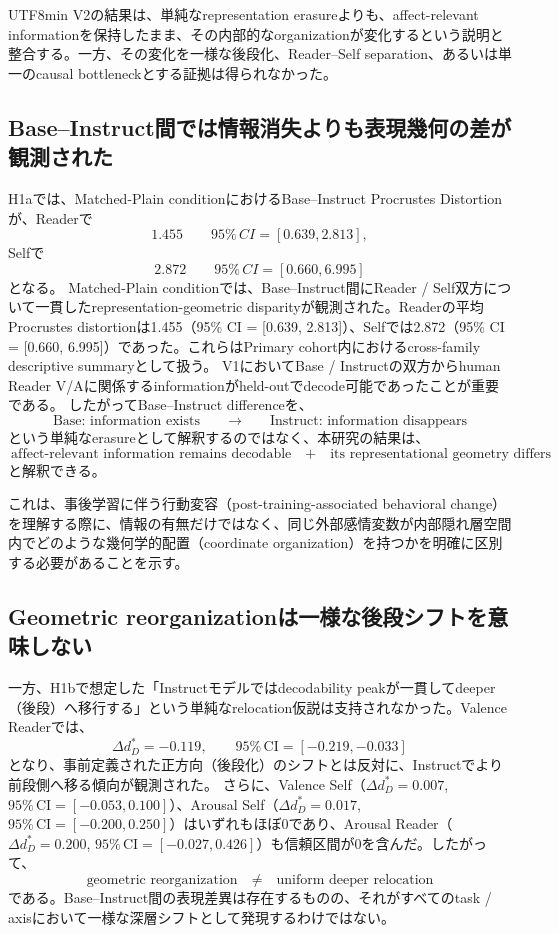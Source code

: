 \documentclass{article} %
\begin{document}
\begin{CJK*}{UTF8}{min}
V2の結果は、単純なrepresentation erasureよりも、affect-relevant informationを保持したまま、その内部的なorganizationが変化するという説明と整合する。一方、その変化を一様な後段化、Reader--Self separation、あるいは単一のcausal bottleneckとする証拠は得られなかった。


\subsection{Base--Instruct間では情報消失よりも表現幾何の差が観測された}

H1aでは、Matched-Plain conditionにおけるBase--Instruct Procrustes Distortionが、Readerで
\[
1.455
\qquad
95\%\,CI=[0.639,2.813],
\]
Selfで
\[
2.872
\qquad
95\%\,CI=[0.660,6.995]
\]
となる。
Matched-Plain conditionでは、Base--Instruct間にReader / Self双方について一貫したrepresentation-geometric disparityが観測された。Readerの平均Procrustes distortionは1.455（95\% CI = [0.639, 2.813]）、Selfでは2.872（95\% CI = [0.660, 6.995]）であった。これらはPrimary cohort内におけるcross-family descriptive summaryとして扱う。
V1においてBase / Instructの双方からhuman Reader V/Aに関係するinformationがheld-outでdecode可能であったことが重要である。
したがってBase--Instruct differenceを、
\[
\text{Base: information exists}
\qquad
\rightarrow
\qquad
\text{Instruct: information disappears}
\]
という単純なerasureとして解釈するのではなく、本研究の結果は、
\[
\text{affect-relevant information remains decodable}
\quad+\quad
\text{its representational geometry differs}
\]
と解釈できる。

これは、事後学習に伴う行動変容（post-training-associated behavioral change）を理解する際に、情報の有無だけではなく、同じ外部感情変数が内部隠れ層空間内でどのような幾何学的配置（coordinate organization）を持つかを明確に区別する必要があることを示す。


\subsection{Geometric reorganizationは一様な後段シフトを意味しない}

一方、H1bで想定した「Instructモデルではdecodability peakが一貫してdeeper（後段）へ移行する」という単純なrelocation仮説は支持されなかった。Valence Readerでは、
\[
\Delta d_D^* = -0.119, \qquad 95\%\,\text{CI} = [-0.219, -0.033]
\]
となり、事前定義された正方向（後段化）のシフトとは反対に、Instructでより前段側へ移る傾向が観測された。
さらに、Valence Self（$\Delta d_D^* = 0.007$, $95\%\,\text{CI} = [-0.053, 0.100]$）、Arousal Self（$\Delta d_D^* = 0.017$, $95\%\,\text{CI} = [-0.200, 0.250]$）はいずれもほぼ0であり、Arousal Reader（$\Delta d_D^* = 0.200$, $95\%\,\text{CI} = [-0.027, 0.426]$）も信頼区間が0を含んだ。したがって、
\[
\text{geometric reorganization}
\quad\neq\quad
\text{uniform deeper relocation}
\]
である。Base--Instruct間の表現差異は存在するものの、それがすべてのtask / axisにおいて一様な深層シフトとして発現するわけではない。



\end{CJK*}
\end{document}

